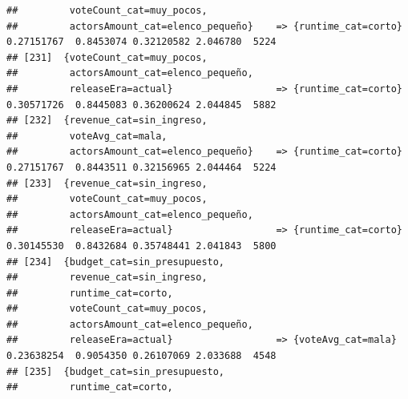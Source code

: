 \documentclass[
]{article}
\begin{document}
\begin{verbatim}
##         voteCount_cat=muy_pocos,                                                                                                
##         actorsAmount_cat=elenco_pequeño}    => {runtime_cat=corto}               0.27151767  0.8453074 0.32120582 2.046780  5224
## [231]  {voteCount_cat=muy_pocos,                                                                                                
##         actorsAmount_cat=elenco_pequeño,                                                                                        
##         releaseEra=actual}                  => {runtime_cat=corto}               0.30571726  0.8445083 0.36200624 2.044845  5882
## [232]  {revenue_cat=sin_ingreso,                                                                                                
##         voteAvg_cat=mala,                                                                                                       
##         actorsAmount_cat=elenco_pequeño}    => {runtime_cat=corto}               0.27151767  0.8443511 0.32156965 2.044464  5224
## [233]  {revenue_cat=sin_ingreso,                                                                                                
##         voteCount_cat=muy_pocos,                                                                                                
##         actorsAmount_cat=elenco_pequeño,                                                                                        
##         releaseEra=actual}                  => {runtime_cat=corto}               0.30145530  0.8432684 0.35748441 2.041843  5800
## [234]  {budget_cat=sin_presupuesto,                                                                                             
##         revenue_cat=sin_ingreso,                                                                                                
##         runtime_cat=corto,                                                                                                      
##         voteCount_cat=muy_pocos,                                                                                                
##         actorsAmount_cat=elenco_pequeño,                                                                                        
##         releaseEra=actual}                  => {voteAvg_cat=mala}                0.23638254  0.9054350 0.26107069 2.033688  4548
## [235]  {budget_cat=sin_presupuesto,                                                                                             
##         runtime_cat=corto,                                                                                                      

\end{verbatim}
\end{document}
